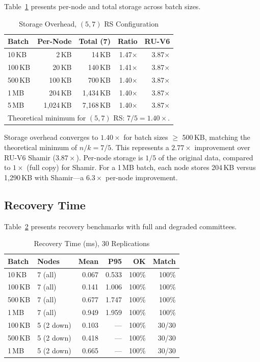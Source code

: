 Table~\ref{tab:storage} presents per-node and total storage across batch
sizes.

\begin{table}[t]
\centering
\caption{Storage Overhead, $(5,7)$ RS Configuration}
\label{tab:storage}
\begin{tabular}{@{}lrrrr@{}}
\toprule
\textbf{Batch} & \textbf{Per-Node} & \textbf{Total (7)} & \textbf{Ratio} & \textbf{RU-V6} \\
\midrule
10\,KB  & 2\,KB     & 14\,KB    & 1.47$\times$ & 3.87$\times$ \\
100\,KB & 20\,KB    & 140\,KB   & 1.41$\times$ & 3.87$\times$ \\
500\,KB & 100\,KB   & 700\,KB   & 1.40$\times$ & 3.87$\times$ \\
1\,MB   & 204\,KB   & 1{,}434\,KB & 1.40$\times$ & 3.87$\times$ \\
5\,MB   & 1{,}024\,KB & 7{,}168\,KB & 1.40$\times$ & 3.87$\times$ \\
\bottomrule
\multicolumn{5}{l}{\footnotesize Theoretical minimum for $(5,7)$ RS: $7/5 = 1.40\times$.} \\
\end{tabular}
\end{table}

Storage overhead converges to $1.40\times$ for batch sizes $\geq$
500\,KB, matching the theoretical minimum of $n/k = 7/5$. This
represents a $2.77\times$ improvement over RU-V6 Shamir ($3.87\times$).
Per-node storage is $1/5$ of the original data, compared to $1\times$
(full copy) for Shamir. For a 1\,MB batch, each node stores 204\,KB
versus 1{,}290\,KB with Shamir---a $6.3\times$ per-node improvement.

\subsection{Recovery Time}

Table~\ref{tab:recovery} presents recovery benchmarks with full and
degraded committees.

\begin{table}[t]
\centering
\caption{Recovery Time (ms), 30 Replications}
\label{tab:recovery}
\begin{tabular}{@{}llrrrr@{}}
\toprule
\textbf{Batch} & \textbf{Nodes} & \textbf{Mean} & \textbf{P95} & \textbf{OK} & \textbf{Match} \\
\midrule
10\,KB  & 7 (all)   & 0.067 & 0.533 & 100\% & 100\% \\
100\,KB & 7 (all)   & 0.141 & 1.006 & 100\% & 100\% \\
500\,KB & 7 (all)   & 0.677 & 1.747 & 100\% & 100\% \\
1\,MB   & 7 (all)   & 0.949 & 1.959 & 100\% & 100\% \\
\midrule
100\,KB & 5 (2 down) & 0.103 & ---   & 100\% & 30/30 \\
500\,KB & 5 (2 down) & 0.418 & ---   & 100\% & 30/30 \\
1\,MB   & 5 (2 down) & 0.665 & ---   & 100\% & 30/30 \\
\bottomrule
\end{tabular}
\end{table}

